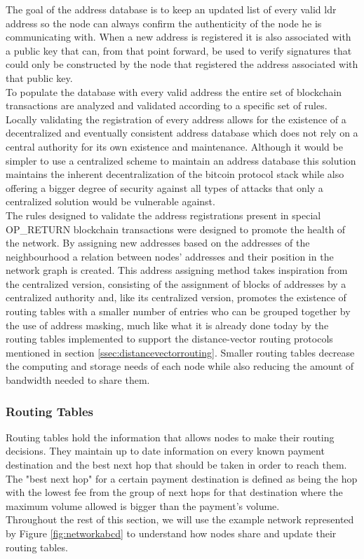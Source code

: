 The goal of the address database is to keep an updated list of every valid \acrshort{ldr} address so the node can always confirm the authenticity of the node he is communicating with. When a new address is registered it is also associated with a public key that can, from that point forward, be used to verify signatures that could only be constructed by the node that registered the address associated with that public key.\\
To populate the database with every valid address the entire set of blockchain transactions are analyzed and validated according to a specific set of rules. Locally validating the registration of every address allows for the existence of a decentralized and eventually consistent address database which does not rely on a central authority for its own existence and maintenance. Although it would be simpler to use a centralized scheme to maintain an address database this solution maintains the inherent decentralization of the bitcoin protocol stack while also offering a bigger degree of security against all types of attacks that only a centralized solution would be vulnerable against. \\
The rules designed to validate the address registrations present in special OP\_RETURN blockchain transactions were designed to promote the health of the network. By assigning new addresses based on the addresses of the neighbourhood a relation between nodes' addresses and their position in the network graph is created. This address assigning method takes inspiration from the centralized version, consisting of the assignment of blocks of addresses by a centralized authority and, like its centralized version, promotes the existence of routing tables with a smaller number of entries who can be grouped together by the use of address masking, much like what it is already done today by the routing tables implemented to support the distance-vector routing protocols mentioned in section \ref{ssec:distancevectorrouting}. Smaller routing tables decrease the computing and storage needs of each node while also reducing the amount of bandwidth needed to share them.

\subsubsection{Routing Tables}
\label{sssec:routing_tables}

Routing tables hold the information that allows nodes to make their routing decisions. They maintain up to date information on every known payment destination and the best next hop that should be taken in order to reach them. The "best next hop" for a certain payment destination is defined as being the hop with the lowest fee from the group of next hops for that destination where the maximum volume allowed is bigger than the payment's volume. \\
Throughout the rest of this section, we will use the example network represented by Figure \ref{fig:networkabcd} to understand how nodes share and update their routing tables.\\

